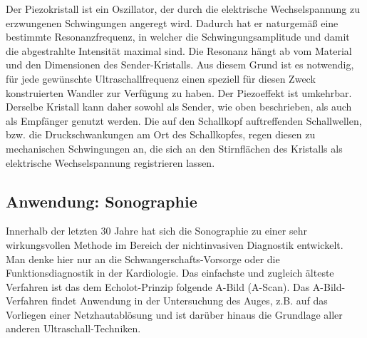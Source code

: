 \noindent
Der Piezokristall ist ein Oszillator, der durch die elektrische Wechselspannung zu erzwungenen Schwingungen angeregt wird. Dadurch hat er naturgemäß eine bestimmte Resonanzfrequenz, in welcher die Schwingungsamplitude und damit die abgestrahlte Intensität maximal sind. Die Resonanz hängt ab vom Material und den Dimensionen des Sender-Kristalls. Aus diesem Grund ist es notwendig, für jede gewünschte Ultraschallfrequenz einen speziell für diesen Zweck konstruierten Wandler zur Verfügung zu haben. Der Piezoeffekt ist umkehrbar. Derselbe Kristall kann daher sowohl als Sender, wie oben beschrieben, als auch als Empfänger genutzt werden. Die auf den Schallkopf auftreffenden Schallwellen, bzw. die Druckschwankungen am Ort des Schallkopfes, regen diesen zu mechanischen Schwingungen an, die sich an den Stirnflächen des Kristalls als elektrische Wechselspannung registrieren lassen.

\subsection{Anwendung: Sonographie}

Innerhalb der letzten 30 Jahre hat sich die Sonographie zu einer sehr wirkungsvollen Methode im Bereich der nichtinvasiven Diagnostik entwickelt. Man denke hier nur an die Schwangerschafts-Vorsorge oder die Funktionsdiagnostik in der Kardiologie. Das einfachste und zugleich älteste Verfahren ist das dem Echolot-Prinzip folgende A-Bild (A-Scan). Das A-Bild-Verfahren findet Anwendung in der Untersuchung des Auges, z.B. auf das Vorliegen einer Netzhautablösung und ist darüber hinaus die Grundlage aller anderen Ultraschall-Techniken.\\

